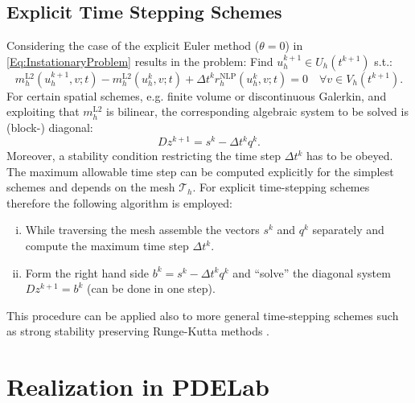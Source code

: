 \documentclass[a4paper,12pt]{article}
\begin{document}
\subsection*{Explicit Time Stepping Schemes}

Considering the case of the explicit Euler method ($\theta=0$) in \eqref{Eq:InstationaryProblem}
results in the problem: Find $u_h^{k+1}\in U_h(t^{k+1})$ s.t.:
\begin{equation*}
 m_h^\text{L2}(u_h^{k+1},v;t)-m_h^\text{L2}(u_h^{k},v;t) +
\Delta t^k r_h^\text{NLP}(u_h^{k},v;t) = 0
\quad \forall v\in V_h(t^{k+1}).
\end{equation*}
For certain spatial schemes, e.g. finite volume or discontinuous Galerkin,
and exploiting that $m_h^\text{L2}$ is bilinear, the corresponding algebraic system
to be solved is (block-) diagonal:
\begin{equation}
Dz^{k+1} = s^k - \Delta t^k q^k.
\end{equation}
Moreover, a stability condition restricting the time step $\Delta t^k$
has to be obeyed. The maximum allowable time step can be computed
explicitly for the simplest schemes and depends on the mesh $\mathcal{T}_h$.
For explicit time-stepping schemes therefore the following algorithm is employed:
\begin{enumerate}[i)]
\item While traversing the mesh assemble the vectors $s^k$ and
$q^k$ separately and compute the maximum time step $\Delta t^k$.
\item Form the right hand side $b^k=s^k - \Delta t^k q^k$ and ``solve'' the
diagonal system $Dz^{k+1} = b^k$ (can be done in one step).
\end{enumerate}
This procedure can be applied also to more general time-stepping schemes
such as strong stability preserving Runge-Kutta methods \cite{shu:88}.

\section{Realization in PDELab}
\end{document}

